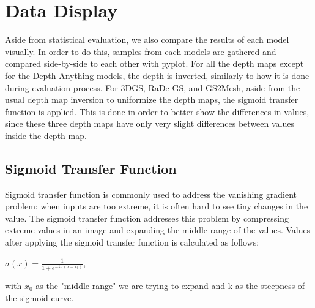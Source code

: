 \section{Data Display}

Aside from statistical evaluation, we also compare the results of each model visually. In order to do this, samples from each models are gathered and compared side-by-side to each other with pyplot. For all the depth maps except for the Depth Anything models, the depth is inverted, similarly to how it is done during evaluation process. For 3DGS, RaDe-GS, and GS2Mesh, aside from the usual depth map inversion to uniformize the depth maps, the sigmoid transfer function is applied. This is done in order to better show the differences in values, since these three depth maps have only very slight differences between values inside the depth map.

\subsection{Sigmoid Transfer Function}

Sigmoid transfer function is commonly used to address the vanishing gradient problem: when inputs are too extreme, it is often hard to see tiny changes in the value. The sigmoid transfer function addresses this problem by compressing extreme values in an image and expanding the middle range of the values. Values after applying the sigmoid transfer function is calculated as follows:

\begin{center}
    \(\sigma(x) = \frac{1}{1 + e^{-k \cdot (x - x_0)}}\),
\end{center}
with \(x_0\) as the "middle range" we are trying to expand and k as the steepness of the sigmoid curve.